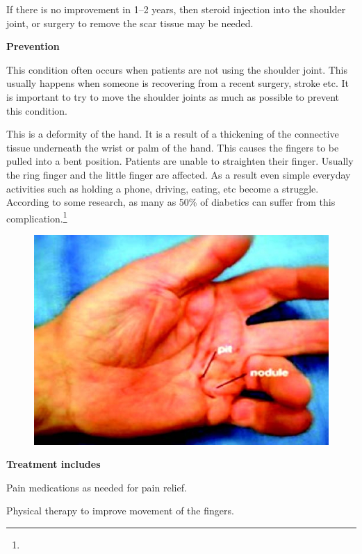  \item If there is no improvement in 1–2 years, then steroid injection into the shoulder joint, or surgery to remove the scar tissue may be needed.

\textbf{Prevention}

This condition often occurs when patients are not using the shoulder joint. This usually happens when someone is recovering from a recent surgery, stroke etc. It is important to try to move the shoulder joints as much as possible to prevent this condition.


This is a deformity of the hand. It is a result of a thickening of the connective tissue underneath the wrist or palm of the hand. This causes the fingers to be pulled into a bent position. Patients are unable to straighten their finger. Usually the ring finger and the little finger are affected. As a result even simple everyday activities such as holding a phone, driving, eating, etc become a struggle. According to some research, as many as 50\% of diabetics can suffer from this complication.\footnote{}

\begin{figure}
\includegraphics{images/074.jpg}
\end{figure}

\textbf{Treatment includes}

\item Pain medications as needed for pain relief.

 \item Physical therapy to improve movement of the fingers.

